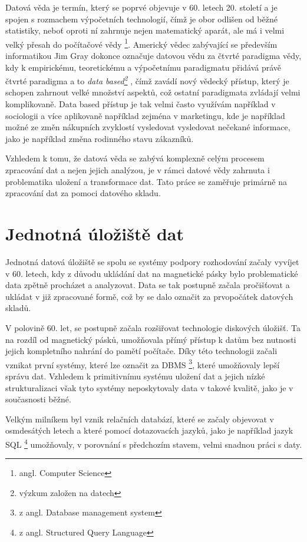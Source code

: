 \documentclass[
  digital,     %
  twoside,     %
  lof,         %
  lot,         %
]{fithesis4}
\begin{document}
 Datová věda je termín, který se poprvé objevuje v 60. letech 20. století a je spojen s rozmachem výpočetních technologií, čímž je obor odlišen od běžné statistiky, neboť  oproti ní zahrnuje nejen matematický aparát, ale má i velmi velký přesah do počítačové vědy \footnote{angl. Computer Science
 }.   \parencite{Foote2021} Americký vědec zabývající se především informatikou Jim Gray dokonce označuje datovou vědu za čtvrté paradigma vědy, kdy k empirickému, teoretickému a výpočetnímu paradigmatu přidává právě čtvrté paradigma a to \emph{data based\footnote{výzkum založen na datech}} \parencite{hey2009fourth}, čímž zavádí nový vědecký přístup, který je schopen zahrnout velké množství aspektů, což ostatní paradigmata zvládají velmi komplikovaně. Data based přístup je tak velmi často využívám například v sociologii a více aplikovaně například zejména v marketingu, kde je například možné ze změn nákupních zvyklostí vysledovat vysledovat nečekané informace, jako je například změna rodinného stavu zákazníků.\parencite{Zeleny2015}
 
Vzhledem k tomu, že datová věda se zabývá komplexně celým procesem zpracování dat a nejen jejich analýzou, je v rámci datové vědy zahrnuta i problematika uložení a transformace dat. Tato práce se zaměřuje primárně na zpracování dat za pomoci datového skladu. 

\chapter {Jednotná úložiště dat}
Jednotná datová úložiště se spolu se systémy podpory rozhodování začaly vyvíjet v 60. letech, kdy z důvodu ukládání dat na magnetické pásky bylo problematické data zpětně procházet a analyzovat. Data se tak postupně začala pročišťovat a ukládat v již zpracované formě, což by se dalo označit za prvopočátek datových skladů.\parencite[s.~2]{Inmon2005}

V polovině 60. let, se postupně začala rozšiřovat technologie diskových úložišť. Ta na rozdíl od magnetický pásků, umožňovala přímý přístup k datům bez nutnosti jejich kompletního nahrání do pamětí počítače. Díky této technologii začali vznikat první systémy, které lze označit za DBMS \footnote{z angl. Database management system}, které umožňovaly lepší správu dat.\parencite{Foote19042018} Vzhledem k primitivnímu systému uložení dat a jejich nízké strukturalizaci však tyto systémy neposkytovaly data v takové kvalitě, jako je v současnosti běžné.

Velkým milníkem byl vznik relačních databází, které se začaly objevovat v osmdesátých letech a které pomocí dotazovacích jazyků, jako je například jazyk SQL \footnote{z angl. Structured Query Language} umožňovaly, v porovnání s předchozím stavem, velmi snadnou práci s daty.\parencite{Foote19042018}
\end{document}
